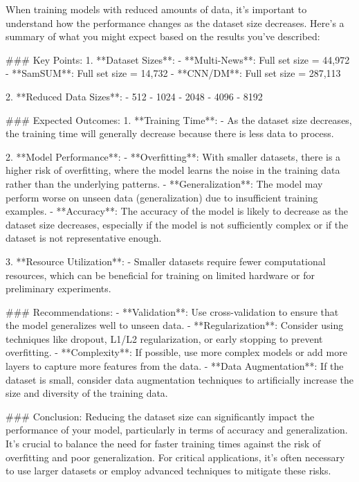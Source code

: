 When training models with reduced amounts of data, it's important to understand how the performance changes as the dataset size decreases. Here’s a summary of what you might expect based on the results you've described:

### Key Points:
1. **Dataset Sizes**:
   - **Multi-News**: Full set size = 44,972
   - **SamSUM**: Full set size = 14,732
   - **CNN/DM**: Full set size = 287,113

2. **Reduced Data Sizes**:
   - 512
   - 1024
   - 2048
   - 4096
   - 8192

### Expected Outcomes:
1. **Training Time**:
   - As the dataset size decreases, the training time will generally decrease because there is less data to process.

2. **Model Performance**:
   - **Overfitting**: With smaller datasets, there is a higher risk of overfitting, where the model learns the noise in the training data rather than the underlying patterns.
   - **Generalization**: The model may perform worse on unseen data (generalization) due to insufficient training examples.
   - **Accuracy**: The accuracy of the model is likely to decrease as the dataset size decreases, especially if the model is not sufficiently complex or if the dataset is not representative enough.

3. **Resource Utilization**:
   - Smaller datasets require fewer computational resources, which can be beneficial for training on limited hardware or for preliminary experiments.

### Recommendations:
- **Validation**: Use cross-validation to ensure that the model generalizes well to unseen data.
- **Regularization**: Consider using techniques like dropout, L1/L2 regularization, or early stopping to prevent overfitting.
- **Complexity**: If possible, use more complex models or add more layers to capture more features from the data.
- **Data Augmentation**: If the dataset is small, consider data augmentation techniques to artificially increase the size and diversity of the training data.

### Conclusion:
Reducing the dataset size can significantly impact the performance of your model, particularly in terms of accuracy and generalization. It's crucial to balance the need for faster training times against the risk of overfitting and poor generalization. For critical applications, it's often necessary to use larger datasets or employ advanced techniques to mitigate these risks.